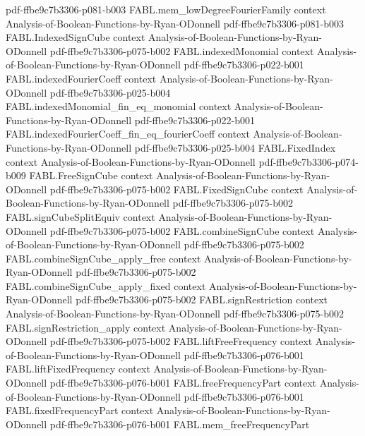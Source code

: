 \begin{theorem}
  {pdf-ffbe9c7b3306-p081-b003}
\proofstep
  {FABL.mem_lowDegreeFourierFamily}
  {context}
  {Analysis-of-Boolean-Functions-by-Ryan-ODonnell}
  {pdf-ffbe9c7b3306-p081-b003}
\proofstep
  {FABL.IndexedSignCube}
  {context}
  {Analysis-of-Boolean-Functions-by-Ryan-ODonnell}
  {pdf-ffbe9c7b3306-p075-b002}
\proofstep
  {FABL.indexedMonomial}
  {context}
  {Analysis-of-Boolean-Functions-by-Ryan-ODonnell}
  {pdf-ffbe9c7b3306-p022-b001}
\proofstep
  {FABL.indexedFourierCoeff}
  {context}
  {Analysis-of-Boolean-Functions-by-Ryan-ODonnell}
  {pdf-ffbe9c7b3306-p025-b004}
\proofstep
  {FABL.indexedMonomial_fin_eq_monomial}
  {context}
  {Analysis-of-Boolean-Functions-by-Ryan-ODonnell}
  {pdf-ffbe9c7b3306-p022-b001}
\proofstep
  {FABL.indexedFourierCoeff_fin_eq_fourierCoeff}
  {context}
  {Analysis-of-Boolean-Functions-by-Ryan-ODonnell}
  {pdf-ffbe9c7b3306-p025-b004}
\proofstep
  {FABL.FixedIndex}
  {context}
  {Analysis-of-Boolean-Functions-by-Ryan-ODonnell}
  {pdf-ffbe9c7b3306-p074-b009}
\proofstep
  {FABL.FreeSignCube}
  {context}
  {Analysis-of-Boolean-Functions-by-Ryan-ODonnell}
  {pdf-ffbe9c7b3306-p075-b002}
\proofstep
  {FABL.FixedSignCube}
  {context}
  {Analysis-of-Boolean-Functions-by-Ryan-ODonnell}
  {pdf-ffbe9c7b3306-p075-b002}
\proofstep
  {FABL.signCubeSplitEquiv}
  {context}
  {Analysis-of-Boolean-Functions-by-Ryan-ODonnell}
  {pdf-ffbe9c7b3306-p075-b002}
\proofstep
  {FABL.combineSignCube}
  {context}
  {Analysis-of-Boolean-Functions-by-Ryan-ODonnell}
  {pdf-ffbe9c7b3306-p075-b002}
\proofstep
  {FABL.combineSignCube_apply_free}
  {context}
  {Analysis-of-Boolean-Functions-by-Ryan-ODonnell}
  {pdf-ffbe9c7b3306-p075-b002}
\proofstep
  {FABL.combineSignCube_apply_fixed}
  {context}
  {Analysis-of-Boolean-Functions-by-Ryan-ODonnell}
  {pdf-ffbe9c7b3306-p075-b002}
\proofstep
  {FABL.signRestriction}
  {context}
  {Analysis-of-Boolean-Functions-by-Ryan-ODonnell}
  {pdf-ffbe9c7b3306-p075-b002}
\proofstep
  {FABL.signRestriction_apply}
  {context}
  {Analysis-of-Boolean-Functions-by-Ryan-ODonnell}
  {pdf-ffbe9c7b3306-p075-b002}
\proofstep
  {FABL.liftFreeFrequency}
  {context}
  {Analysis-of-Boolean-Functions-by-Ryan-ODonnell}
  {pdf-ffbe9c7b3306-p076-b001}
\proofstep
  {FABL.liftFixedFrequency}
  {context}
  {Analysis-of-Boolean-Functions-by-Ryan-ODonnell}
  {pdf-ffbe9c7b3306-p076-b001}
\proofstep
  {FABL.freeFrequencyPart}
  {context}
  {Analysis-of-Boolean-Functions-by-Ryan-ODonnell}
  {pdf-ffbe9c7b3306-p076-b001}
\proofstep
  {FABL.fixedFrequencyPart}
  {context}
  {Analysis-of-Boolean-Functions-by-Ryan-ODonnell}
  {pdf-ffbe9c7b3306-p076-b001}
\proofstep
  {FABL.mem_freeFrequencyPart}

\end{theorem}
